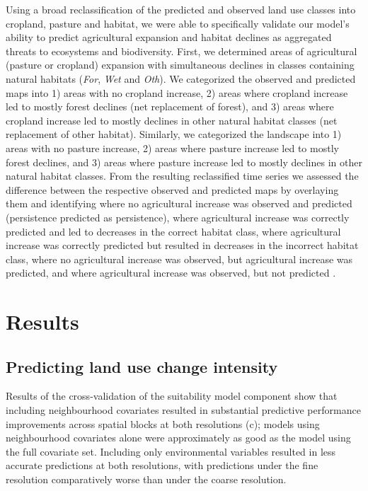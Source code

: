 \documentclass[titlesmallcaps,copyrightpage]{uomthesis}\usepackage[]{graphicx}\usepackage[]{color}
\begin{document}
Using a broad reclassification of the predicted and observed land use
classes into cropland, pasture and habitat, we were able to specifically
validate our model's ability to predict agricultural expansion and
habitat declines as aggregated threats to ecosystems and biodiversity.
First, we determined areas of agricultural (pasture or cropland)
expansion with simultaneous declines in classes containing natural
habitats (\emph{For}, \emph{Wet} and \emph{Oth}). We categorized the
observed and predicted maps into 1) areas with no cropland increase, 2)
areas where cropland increase led to mostly forest declines (net
replacement of forest), and 3) areas where cropland increase led to
mostly declines in other natural habitat classes (net replacement of
other habitat). Similarly, we categorized the landscape into 1) areas
with no pasture increase, 2) areas where pasture increase led to mostly
forest declines, and 3) areas where pasture increase led to mostly
declines in other natural habitat classes. From the resulting
reclassified time series we assessed the difference between the
respective observed and predicted maps by overlaying them and
identifying where no agricultural increase was observed and predicted
(persistence predicted as persistence), where agricultural increase was
correctly predicted and led to decreases in the correct habitat class,
where agricultural increase was correctly predicted but resulted in
decreases in the incorrect habitat class, where no agricultural increase
was observed, but agricultural increase was predicted, and where
agricultural increase was observed, but not predicted
\citep{pontius_comparison_2011}.

\section{Results}

\subsection{Predicting land use change intensity}

Results of the cross-validation of the suitability model component show
that including neighbourhood covariates resulted in substantial
predictive performance improvements across spatial blocks at both
resolutions (c); models using neighbourhood
covariates alone were approximately as good as the model using the full
covariate set. Including only environmental variables resulted in less
accurate predictions at both resolutions, with predictions under the
fine resolution comparatively worse than under the coarse resolution.
\end{document}
